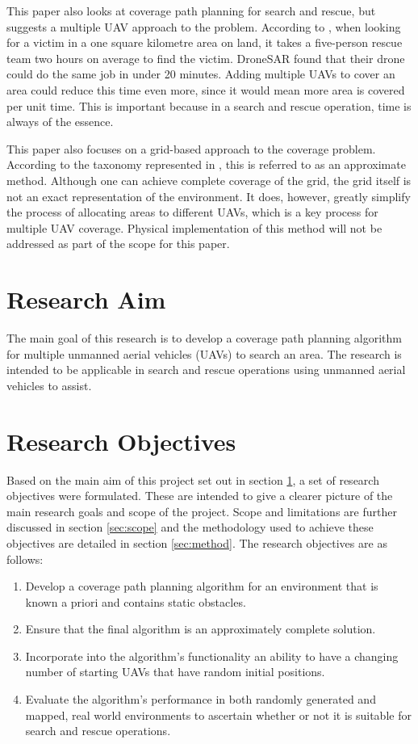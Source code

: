 This paper also looks at coverage path planning for search and rescue, but suggests a multiple UAV approach to the problem. According to \cite{DroneSAR01}, when looking for a victim in a one square kilometre area on land, it takes a five-person rescue team two hours on average to find the victim. DroneSAR found that their drone could do the same job in under 20 minutes.
Adding multiple UAVs to cover an area could reduce this time even more, since it would mean more area is covered per unit time. This is important because in a search and rescue operation, time is always of the essence.

This paper also focuses on a grid-based approach to the coverage problem. According to the taxonomy represented in \cite{Choset2001}, this is referred to as an approximate method. Although one can achieve complete coverage of the grid, the grid itself is not an exact representation of the environment. It does, however, greatly simplify the process of allocating areas to different UAVs, which is a key process for multiple UAV coverage. Physical implementation of this method will not be addressed as part of the scope for this paper.

\section{Research Aim}
\label{sec:researchAim}
The main goal of this research is to develop a coverage path planning algorithm for multiple unmanned aerial vehicles (UAVs) to search an area. The research is intended to be applicable in search and rescue operations using unmanned aerial vehicles to assist.

\section{Research Objectives}
Based on the main aim of this project set out in section \ref{sec:researchAim}, a set of research objectives were formulated. These are intended to give a clearer picture of the main research goals and scope of the project. Scope and limitations are further discussed in section \ref{sec:scope} and the methodology used to achieve these objectives are detailed in section \ref{sec:method}. The research objectives are as follows:
\begin{enumerate}
	\item Develop a coverage path planning algorithm for an environment that is known a priori and contains static obstacles.
	\item Ensure that the final algorithm is an approximately complete solution.
	\item Incorporate into the algorithm's functionality an ability to have a changing number of starting UAVs that have random initial positions.
	\item Evaluate the algorithm's performance in both randomly generated and mapped, real world environments to ascertain whether or not it is suitable for search and rescue operations.
\end{enumerate}

